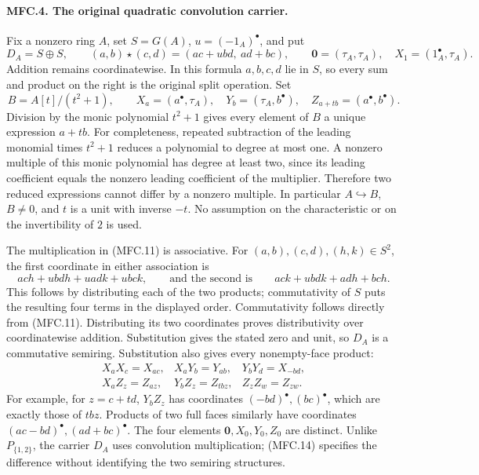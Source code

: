 \paragraph{MFC.4. The original quadratic convolution carrier.}
Fix a nonzero ring \(A\), set \(S=G(A)\),
\(u=(-1_A)^\bullet\), and put
\[
 D_A=S\oplus S,\qquad
 (a,b)\star(c,d)=(ac+ubd,\ ad+bc),\qquad
 \mathbf0=(\tau_A,\tau_A),\quad
 X_1=(1_A^\bullet,\tau_A).                                \tag{MFC.11}
\]
Addition remains coordinatewise. In this formula \(a,b,c,d\) lie in
\(S\), so every sum and product on the right is the original split
operation. Set
\[
 B=A[t]/(t^2+1),\qquad
 X_a=(a^\bullet,\tau_A),\quad
 Y_b=(\tau_A,b^\bullet),\quad
 Z_{a+tb}=(a^\bullet,b^\bullet).                            \tag{MFC.12}
\]
Division by the monic polynomial \(t^2+1\) gives every element of \(B\)
a unique expression \(a+tb\). For completeness, repeated subtraction
of the leading monomial times \(t^2+1\) reduces a polynomial to degree
at most one. A nonzero multiple of this monic polynomial has degree
at least two, since its leading coefficient equals the nonzero leading
coefficient of the multiplier. Therefore two reduced expressions cannot
differ by a nonzero multiple. In particular \(A\hookrightarrow B\),
\(B\ne0\), and \(t\) is a unit with inverse \(-t\). No assumption on
the characteristic or on the invertibility of \(2\) is used.

The multiplication in (MFC.11) is associative. For
\((a,b),(c,d),(h,k)\in S^2\), the first coordinate in either
association is
\[
 ach+ubdh+uadk+ubck,
 \qquad\text{and the second is}\qquad
 ack+ubdk+adh+bch.                                       \tag{MFC.13}
\]
This follows by distributing each of the two products; commutativity
of \(S\) puts the resulting four terms in the displayed order.
Commutativity follows directly from (MFC.11). Distributing its two
coordinates proves distributivity over coordinatewise addition.
Substitution gives the stated zero and unit, so \(D_A\) is a
commutative semiring. Substitution also gives every nonempty-face
product:
\[
 \begin{array}{lll}
 X_aX_c=X_{ac},&X_aY_b=Y_{ab},&Y_bY_d=X_{-bd},\\
 X_aZ_z=Z_{az},&Y_bZ_z=Z_{tbz},&Z_zZ_w=Z_{zw}.
 \end{array}                                             \tag{MFC.14}
\]
For example, for \(z=c+td\), \(Y_bZ_z\) has coordinates
\((-bd)^\bullet,(bc)^\bullet\), which are exactly those of \(tbz\).
Products of two full faces similarly have coordinates
\((ac-bd)^\bullet,(ad+bc)^\bullet\).
The four elements \(\mathbf0,X_0,Y_0,Z_0\) are distinct.
Unlike \(P_{\{1,2\}}\), the carrier \(D_A\) uses convolution
multiplication; (MFC.14) specifies the difference without identifying
the two semiring structures.

